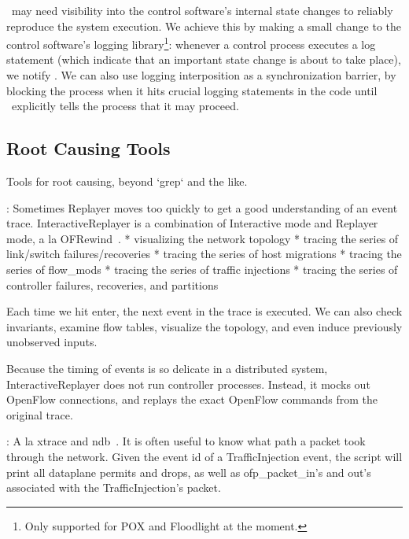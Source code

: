 \projectname~may need visibility into the control software's internal state
changes to reliably reproduce the system execution. We achieve this by
making a
small change to the control software's logging library\footnote{Only supported
for POX and Floodlight at the moment.}: whenever a control process executes a log
statement (which indicate that an important state change is about to take
place), we notify \projectname. We can also use logging interposition as a
synchronization barrier, by blocking the process when it hits crucial logging statements in the code
until \projectname~explicitly tells the process that it may proceed.

\subsection{Root Causing Tools}

Tools for root causing, beyond `grep` and the like.

:
Sometimes Replayer moves too quickly to get a good understanding of an event
trace. InteractiveReplayer is a combination of Interactive mode and Replayer
mode, a la OFRewind~\cite{ofrewind}.
* visualizing the network topology
* tracing the series of link/switch failures/recoveries
* tracing the series of host migrations
* tracing the series of flow\_mods
* tracing the series of traffic injections
* tracing the series of controller failures, recoveries, and partitions

Each time we hit enter,
the next event in the trace is executed. We can also check invariants, examine
flow tables, visualize the topology, and even induce previously unobserved
inputs.

Because the timing of events is so delicate in a distributed system,
InteractiveReplayer does not run controller processes. Instead, it mocks out
OpenFlow connections, and replays the exact OpenFlow commands from the
original trace.

:
A la xtrace and ndb~\cite{fonseca2007x,handigol2012debugger}.
It is often useful to know what path a packet took through the network. Given
the event id of a TrafficInjection event, the
script will print all dataplane permits and
drops, as well as ofp\_packet\_in's and out's associated with the
TrafficInjection's packet.

